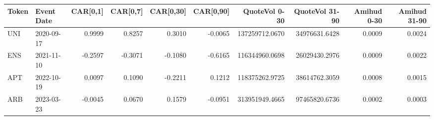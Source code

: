 \begin{tabular}{llrrrrrrrr}
\toprule
Token & Event Date & CAR[0,1] & CAR[0,7] & CAR[0,30] & CAR[0,90] & QuoteVol 0-30 & QuoteVol 31-90 & Amihud 0-30 & Amihud 31-90 \\
\midrule
UNI & 2020-09-17 & 0.9999 & 0.8257 & 0.3010 & -0.0065 & 137259712.0670 & 34976631.6428 & 0.0009 & 0.0024 \\
ENS & 2021-11-10 & -0.2597 & -0.3071 & -0.1080 & -0.6165 & 116344960.0698 & 26029430.2976 & 0.0009 & 0.0022 \\
APT & 2022-10-19 & 0.0097 & 0.1090 & -0.2211 & 0.1212 & 118375262.9725 & 38614762.3059 & 0.0008 & 0.0015 \\
ARB & 2023-03-23 & -0.0045 & 0.0670 & 0.1579 & -0.0951 & 313951949.4665 & 97465820.6736 & 0.0002 & 0.0003 \\
\bottomrule
\end{tabular}

